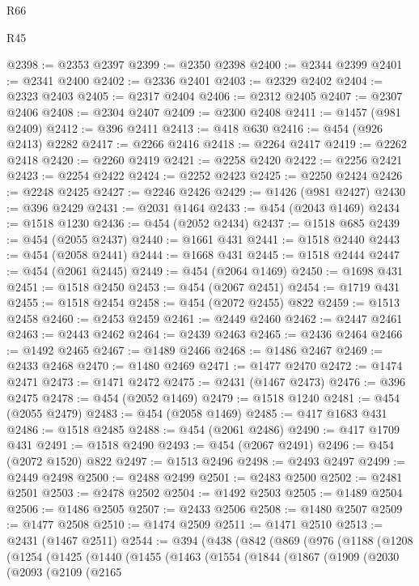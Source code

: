 \begin{lexlean}{R66}
\begin{lexlean}{R45}
\begin{coremodule}
{{{{{{{{{{{{{{{{{{{{{{{{{{{{{{{{{{{{{{{{{{{{{{{{{{{{{{{{{{{{{{{{{{{{{{{{{{{{{{{{{{{{{{{{{{{@2398 := @2353 @2397
@2399 := @2350 @2398
@2400 := @2344 @2399
@2401 := @2341 @2400
@2402 := @2336 @2401
@2403 := @2329 @2402
@2404 := @2323 @2403
@2405 := @2317 @2404
@2406 := @2312 @2405
@2407 := @2307 @2406
@2408 := @2304 @2407
@2409 := @2300 @2408
@2411 := @1457 (@981 @2409)
@2412 := @396 @2411
@2413 := @418 @630
@2416 := @454 (@926 @2413) @2282
@2417 := @2266 @2416
@2418 := @2264 @2417
@2419 := @2262 @2418
@2420 := @2260 @2419
@2421 := @2258 @2420
@2422 := @2256 @2421
@2423 := @2254 @2422
@2424 := @2252 @2423
@2425 := @2250 @2424
@2426 := @2248 @2425
@2427 := @2246 @2426
@2429 := @1426 (@981 @2427)
@2430 := @396 @2429
@2431 := @2031 @1464
@2433 := @454 (@2043 @1469)
@2434 := @1518 @1230
@2436 := @454 (@2052 @2434)
@2437 := @1518 @685
@2439 := @454 (@2055 @2437)
@2440 := @1661 @431
@2441 := @1518 @2440
@2443 := @454 (@2058 @2441)
@2444 := @1668 @431
@2445 := @1518 @2444
@2447 := @454 (@2061 @2445)
@2449 := @454 (@2064 @1469)
@2450 := @1698 @431
@2451 := @1518 @2450
@2453 := @454 (@2067 @2451)
@2454 := @1719 @431
@2455 := @1518 @2454
@2458 := @454 (@2072 @2455) @822
@2459 := @1513 @2458
@2460 := @2453 @2459
@2461 := @2449 @2460
@2462 := @2447 @2461
@2463 := @2443 @2462
@2464 := @2439 @2463
@2465 := @2436 @2464
@2466 := @1492 @2465
@2467 := @1489 @2466
@2468 := @1486 @2467
@2469 := @2433 @2468
@2470 := @1480 @2469
@2471 := @1477 @2470
@2472 := @1474 @2471
@2473 := @1471 @2472
@2475 := @2431 (@1467 @2473)
@2476 := @396 @2475
@2478 := @454 (@2052 @1469)
@2479 := @1518 @1240
@2481 := @454 (@2055 @2479)
@2483 := @454 (@2058 @1469)
@2485 := @417 @1683 @431
@2486 := @1518 @2485
@2488 := @454 (@2061 @2486)
@2490 := @417 @1709 @431
@2491 := @1518 @2490
@2493 := @454 (@2067 @2491)
@2496 := @454 (@2072 @1520) @822
@2497 := @1513 @2496
@2498 := @2493 @2497
@2499 := @2449 @2498
@2500 := @2488 @2499
@2501 := @2483 @2500
@2502 := @2481 @2501
@2503 := @2478 @2502
@2504 := @1492 @2503
@2505 := @1489 @2504
@2506 := @1486 @2505
@2507 := @2433 @2506
@2508 := @1480 @2507
@2509 := @1477 @2508
@2510 := @1474 @2509
@2511 := @1471 @2510
@2513 := @2431 (@1467 @2511)
@2544 := @394
    (@438
      (@842
        (@869
          (@976
            (@1188
              (@1208
                (@1254
                  (@1425
                    (@1440
                      (@1455
                        (@1463
                          (@1554
                            (@1844
                              (@1867
                                (@1909
                                  (@2030
                                    (@2093
                                      (@2109
                                        (@2165
}}}}}}}}}}}}}}}}}}}}}}}}}}}}}}}}}}}}}}}}}}}}}}}}}}}}}}}}}}}}}}}}}}}}}}}}}}}}}}}}}}}}}}}}}}}
\end{coremodule}
\end{lexlean}
\end{lexlean}

